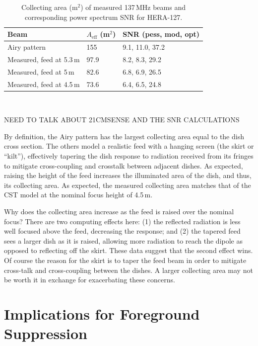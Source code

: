 \documentclass{emulateapj}
\begin{document}
 \begin{table}[h]
 \caption{ \label{table:collectingareatable}Collecting area (m$^2$) of measured 137\,MHz beams and corresponding power spectrum SNR for HERA-127.}
\begin{tabular}{| l | l | l |}
\hline
Beam & $A_\text{eff}$ (m$^2$) & SNR (pess, mod, opt)\\
\hline
  Airy pattern & 155 & 9.1, 11.0, 37.2  \\
    Measured, feed at 5.3\,m & 97.9 & 8.2, 8.3, 29.2 \\
    Measured, feed at 5\,m & 82.6 & 6.8, 6.9, 26.5 \\
    Measured, feed at 4.5\,m & 73.6 & 6.4, 6.5, 24.8 \\ 
  \hline
\end{tabular}
\end{table}\

NEED TO TALK ABOUT 21CMSENSE AND THE SNR CALCULATIONS

By definition, the Airy pattern has the largest collecting area equal to the dish cross section. The others model a realistic feed with a hanging screen (the skirt or ``kilt''), effectively tapering the dish response to radiation received from its fringes to mitigate cross-coupling and crosstalk between adjacent dishes. As expected, raising the height of the feed increases the illuminated area of the dish, and thus, its collecting area. As expected, the measured collecting area matches that of the CST model at the nominal focus height of 4.5\,m.

Why does the collecting area increase as the feed is raised over the nominal focus? There are two computing effects here: (1) the reflected radiation is less well focused above the feed, decreasing the response; and (2) the tapered feed sees a larger dish as it is raised, allowing more radiation to reach the dipole as opposed to reflecting off the skirt. These data suggest that the second effect wins. Of course the reason for the skirt is to taper the feed beam in order to mitigate cross-talk and cross-coupling between the dishes. A larger collecting area may not be worth it in exchange for exacerbating these concerns.

\section{Implications for Foreground Suppression}
\label{sec:foregrounds}
\end{document}

